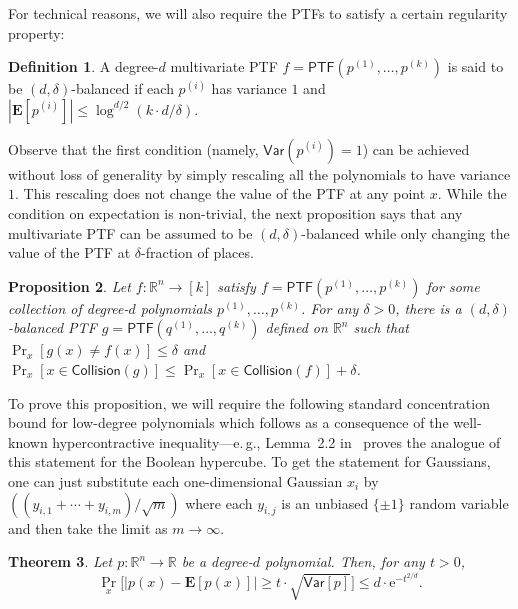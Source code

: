 \documentclass[11pt]{article}
\numberwithin{equation}{section}
\newtheorem{theorem}{Theorem}[section]
\newtheorem{proposition}[theorem]{Proposition}
\theoremstyle{definition}
\newtheorem{definition}[theorem]{Definition}
\theoremstyle{plain}
\newcommand{\R}{\mathbb R}
\newcommand{\eee}{\mathrm e}
\newcommand{\eg}{e.\,g.}
\begin{document}
For technical reasons, we will also require the PTFs to satisfy a certain regularity property:
\begin{definition} A degree-$d$ multivariate PTF $f = \mathsf{PTF}(p^{(1)}, \ldots, p^{(k)})$ is said to be $(d, \delta)$-balanced if each $p^{(i)}$ has variance $1$ and $|\mathbf{E}[p^{(i)}]| \le \log^{d/2} (k \cdot d/\delta)$. 
\end{definition}
Observe that the first condition (namely, $\mathsf{Var}(p^{(i)}) =1$) can be
achieved without loss of generality by simply rescaling all the polynomials to
have variance $1$. This rescaling does not change the value of the PTF at any
point $x$. While the condition on expectation is non-trivial, the next
proposition says that any multivariate PTF can be assumed to be
$(d,\delta)$-balanced while only changing the value of the PTF at
$\delta$-fraction of places. 
\begin{proposition}\label{prop:balanced}
Let $f : \mathbb{R}^n \rightarrow [k]$ satisfy $f = \mathsf{PTF}(p^{(1)},
\ldots, p^{(k)})$ for some
%
collection of
%
degree-$d$ polynomials $p^{(1)}, \dots, p^{(k)}$.
For any $\delta > 0$,
there is a $(d,\delta)$-balanced PTF $g = \mathsf{PTF}(q^{(1)}, \ldots, q^{(k)})$
defined on $\R^n$ such that $\Pr_{x} [g(x) \neq  f(x) ] \le \delta$ and
$\Pr_{x}[ x \in \mathsf{Collision}(g)] \le \Pr_{x} [x \in
\mathsf{Collision}(f)] + \delta$.
%
%
\end{proposition}
To prove this proposition, we will require the following standard concentration bound for low-degree polynomials which follows as a consequence of the well-known hypercontractive inequality---\eg, Lemma~2.2 in~\cite{DFKO06} proves the analogue of this statement for the Boolean hypercube. To get the statement for Gaussians, one can just substitute each one-dimensional Gaussian $x_i$ by $((y_{i,1} + \cdots + y_{i,m})/\sqrt{m})$ where each $y_{i,j}$ is an unbiased $\{\pm 1\}$ random variable and then take the limit as $m \rightarrow \infty$. %
\begin{theorem}\label{thm:hyper}
Let $p: \mathbb{R}^n \rightarrow \mathbb{R}$ be a degree-$d$ polynomial. Then, for any $t>0$, 
$$
\Pr_{x} \big[|p(x) - \mathbf{E}[p(x)]| \ge t \cdot \sqrt{\mathsf{Var}[p]}\big]  \leq d \cdot \eee^{-t^{2/d}}.
$$
\end{theorem}
\end{document}
